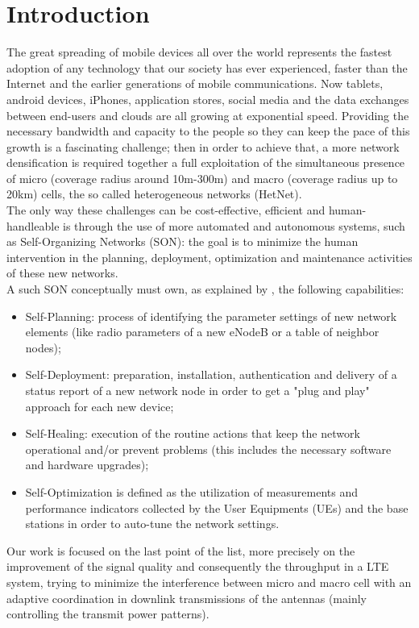 \documentclass[conference,10pt]{IEEEtran}
\begin{document}
\section{Introduction}\label{sec:intro}
The great spreading of mobile devices all over the world represents the fastest adoption of any technology that
our society has ever experienced, faster than the Internet and the earlier generations of mobile
communications. Now tablets, android devices, iPhones, application stores, social media and the data
exchanges between end-users and clouds are all growing at exponential speed. Providing the necessary bandwidth and capacity to the people so they can keep the pace of this growth is a fascinating challenge; then in order to achieve that, a more network densification is required together a full exploitation of the simultaneous presence of micro (coverage radius around 10m-300m) and macro (coverage radius up to 20km) cells, the so called heterogeneous networks (HetNet).\\
The only way these challenges can be cost-effective, efficient and human-handleable is through the use of more automated and autonomous systems, such as Self-Organizing Networks (SON): the goal is to minimize the human intervention in the planning, deployment, optimization and maintenance activities of these new networks.\\
A such SON conceptually must own, as explained by \cite{ramiro2011self}, the following capabilities:
\begin{itemize}
\item Self-Planning: process of identifying the parameter settings of new network elements (like radio parameters of a new eNodeB or a table of neighbor nodes);
\item Self-Deployment: preparation, installation, authentication and delivery of a status report of
a new network node in order to get a "plug and play" approach for each new device;
\item Self-Healing: execution of the routine actions that keep the network operational and/or
prevent problems (this includes the necessary software and hardware upgrades);
\item Self-Optimization is defined as the utilization of measurements and performance indicators
collected by the User Equipments (UEs) and the base stations in order to auto-tune the network
settings.
\end{itemize}
Our work is focused on the last point of the list, more precisely on the improvement of the signal quality and consequently the throughput in a LTE system, trying to minimize the interference between micro and macro cell with an adaptive coordination in downlink transmissions of the antennas (mainly controlling the transmit power patterns).\\
\end{document}
